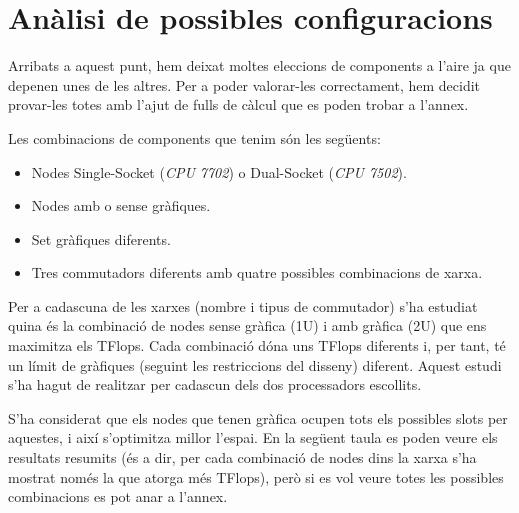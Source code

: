 \section{Anàlisi de possibles configuracions}\label{sec:analisi}

Arribats a aquest punt, hem deixat moltes eleccions de components a l'aire ja que depenen unes de les altres. Per a poder valorar-les correctament, hem decidit provar-les totes amb l'ajut de fulls de càlcul que es poden trobar a l'annex.

Les combinacions de components que tenim són les següents:
\begin{itemize}
    \item {Nodes Single-Socket (\textit{CPU 7702}) o Dual-Socket (\textit{CPU 7502})}.
    \item {Nodes amb o sense gràfiques}.
    \item {Set gràfiques diferents}.
    \item {Tres commutadors diferents amb quatre possibles combinacions de xarxa}.
\end{itemize}



Per a cadascuna de les xarxes (nombre i tipus de commutador) s'ha estudiat quina és la combinació de nodes sense gràfica (1U) i amb gràfica (2U) que ens maximitza els TFlops. Cada combinació dóna uns TFlops diferents i, per tant, té un límit de gràfiques (seguint les restriccions del disseny) diferent. Aquest estudi s'ha hagut de realitzar per cadascun dels dos processadors escollits.

S'ha considerat que els nodes que tenen gràfica ocupen tots els possibles slots per aquestes, i així s'optimitza millor l'espai. En la següent taula es poden veure els resultats resumits (és a dir, per cada combinació de nodes dins la xarxa s'ha mostrat només la que atorga més TFlops), però si es vol veure totes les possibles combinacions es pot anar a l'annex.

